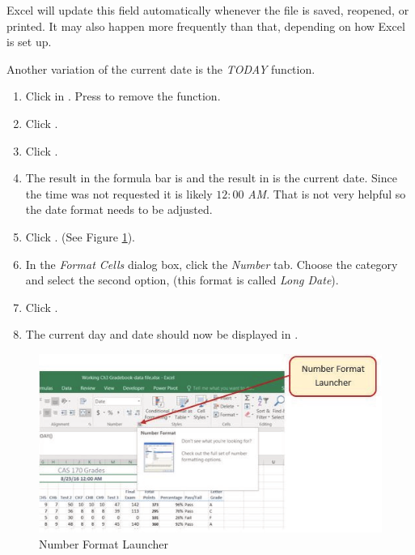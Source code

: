 Excel will update this field automatically whenever the file is saved, reopened, or printed. It may also happen more frequently than that, depending on how Excel is set up.

Another variation of the current date is the \textit{TODAY} function.

\begin{enumerate}
	\item Click in . Press  to remove the  function.
	\item Click . 
	\item Click .
	\item The result in the formula bar is  and the result in  is the current date. Since the time was not requested it is likely $ 12\!:\!00 $\textit{ AM}. That is not very helpful so the date format needs to be adjusted.
	\item Click . (See Figure \ref{03:fig17}).
	\item In the \textit{Format Cells} dialog box, click the \textit{Number} tab. Choose the  category and select the second option,  (this format is called \textit{Long Date}).
	\item Click .
	\item The current day and date should now be displayed in .
\end{enumerate}

\begin{figure}[H]
	\centering
	\includegraphics[width=\maxwidth{.95\linewidth}]{gfx/ch03_fig17}
	\caption{Number Format Launcher}
	\label{03:fig17}
\end{figure}

